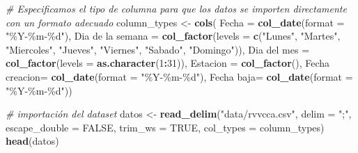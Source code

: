 \documentclass[notspecified,article,submit,moreauthors,pdftex]{Definitions/mdpi}
\newenvironment{Shaded}{\begin{snugshade}}{\end{snugshade}}
\newcommand{\AttributeTok}[1]{\textcolor[rgb]{0.13,0.29,0.53}{#1}}
\newcommand{\CommentTok}[1]{\textcolor[rgb]{0.56,0.35,0.01}{\textit{#1}}}
\newcommand{\ConstantTok}[1]{\textcolor[rgb]{0.56,0.35,0.01}{#1}}
\newcommand{\DecValTok}[1]{\textcolor[rgb]{0.00,0.00,0.81}{#1}}
\newcommand{\FunctionTok}[1]{\textcolor[rgb]{0.13,0.29,0.53}{\textbf{#1}}}
\newcommand{\NormalTok}[1]{#1}
\newcommand{\OtherTok}[1]{\textcolor[rgb]{0.56,0.35,0.01}{#1}}
\newcommand{\SpecialCharTok}[1]{\textcolor[rgb]{0.81,0.36,0.00}{\textbf{#1}}}
\newcommand{\StringTok}[1]{\textcolor[rgb]{0.31,0.60,0.02}{#1}}
\begin{document}
\begin{Shaded}
\begin{Highlighting}[]
\CommentTok{\# Especificamos el tipo de columna para que los datos se importen directamente con un formato adecuado}
\NormalTok{column\_types }\OtherTok{\textless{}{-}} \FunctionTok{cols}\NormalTok{(}
  \AttributeTok{Fecha =} \FunctionTok{col\_date}\NormalTok{(}\AttributeTok{format =} \StringTok{"\%Y{-}\%m{-}\%d"}\NormalTok{),}
  \StringTok{\textasciigrave{}}\AttributeTok{Dia de la semana}\StringTok{\textasciigrave{}} \OtherTok{=} \FunctionTok{col\_factor}\NormalTok{(}\AttributeTok{levels =} \FunctionTok{c}\NormalTok{(}\StringTok{"Lunes"}\NormalTok{, }\StringTok{"Martes"}\NormalTok{,  }\StringTok{"Miercoles"}\NormalTok{, }\StringTok{"Jueves"}\NormalTok{, }\StringTok{"Viernes"}\NormalTok{, }\StringTok{"Sabado"}\NormalTok{, }\StringTok{"Domingo"}\NormalTok{)),}
  \StringTok{\textasciigrave{}}\AttributeTok{Dia del mes}\StringTok{\textasciigrave{}} \OtherTok{=} \FunctionTok{col\_factor}\NormalTok{(}\AttributeTok{levels =} \FunctionTok{as.character}\NormalTok{(}\DecValTok{1}\SpecialCharTok{:}\DecValTok{31}\NormalTok{)),}
  \AttributeTok{Estacion =} \FunctionTok{col\_factor}\NormalTok{(),}
  \StringTok{\textasciigrave{}}\AttributeTok{Fecha creacion}\StringTok{\textasciigrave{}}\OtherTok{=} \FunctionTok{col\_date}\NormalTok{(}\AttributeTok{format =} \StringTok{"\%Y{-}\%m{-}\%d"}\NormalTok{),}
  \StringTok{\textasciigrave{}}\AttributeTok{Fecha baja}\StringTok{\textasciigrave{}}\OtherTok{=} \FunctionTok{col\_date}\NormalTok{(}\AttributeTok{format =} \StringTok{"\%Y{-}\%m{-}\%d"}\NormalTok{))}

\CommentTok{\# importación del dataset}
\NormalTok{datos }\OtherTok{\textless{}{-}} \FunctionTok{read\_delim}\NormalTok{(}\StringTok{"data/rvvcca.csv"}\NormalTok{, }\AttributeTok{delim =} \StringTok{";"}\NormalTok{, }\AttributeTok{escape\_double =} \ConstantTok{FALSE}\NormalTok{, }\AttributeTok{trim\_ws =} \ConstantTok{TRUE}\NormalTok{, }\AttributeTok{col\_types =}\NormalTok{ column\_types)}
\FunctionTok{head}\NormalTok{(datos)}
\end{Highlighting}
\end{Shaded}
\end{document}
